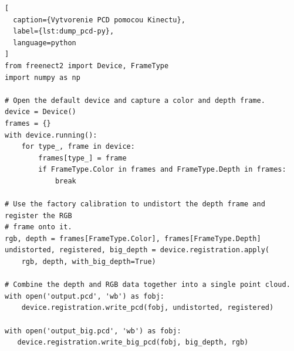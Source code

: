 \begin{lstlisting}[
  caption={Vytvorenie PCD pomocou Kinectu},
  label={lst:dump_pcd-py},
  language=python
]
from freenect2 import Device, FrameType
import numpy as np

# Open the default device and capture a color and depth frame.
device = Device()
frames = {}
with device.running():
    for type_, frame in device:
        frames[type_] = frame
        if FrameType.Color in frames and FrameType.Depth in frames:
            break

# Use the factory calibration to undistort the depth frame and register the RGB
# frame onto it.
rgb, depth = frames[FrameType.Color], frames[FrameType.Depth]
undistorted, registered, big_depth = device.registration.apply(
    rgb, depth, with_big_depth=True)

# Combine the depth and RGB data together into a single point cloud.
with open('output.pcd', 'wb') as fobj:
    device.registration.write_pcd(fobj, undistorted, registered)

with open('output_big.pcd', 'wb') as fobj:
   device.registration.write_big_pcd(fobj, big_depth, rgb)
\end{lstlisting}